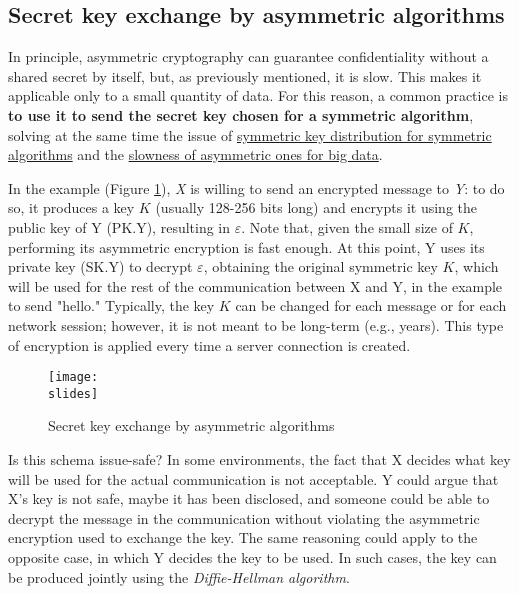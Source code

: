 \subsection{Secret key exchange by asymmetric algorithms}\label{chap:keyexchangeasymmetric}
In principle, asymmetric cryptography can guarantee confidentiality without a shared secret by itself, but, as previously mentioned, it is slow. This makes it applicable only to a small quantity of data. For this reason, a common practice is \textbf{to use it to send the secret key chosen for a symmetric algorithm}, solving at the same time the issue of \ul{symmetric key distribution for symmetric algorithms} and the \ul{slowness of asymmetric ones for big data}.

In the example (Figure \ref*{fig:keyexchangeasymmetric}), \textit{X} is willing to send an encrypted message to \textit{Y}: to do so, it produces a key \(K\) (usually 128-256 bits long) and encrypts it using the public key of Y (\(\text{PK.Y}\)), resulting in \(\varepsilon\). Note that, given the small size of \(K\), performing its asymmetric encryption is fast enough. At this point, Y uses its private key (\(\text{SK.Y}\)) to decrypt \(\varepsilon\), obtaining the original symmetric key \(K\), which will be used for the rest of the communication between X and Y, in the example to send "hello." Typically, the key \(K\) can be changed for each message or for each network session; however, it is not meant to be long-term (e.g., years). This type of encryption is applied every time a server connection is created.

\begin{figure}[h]
    \centering
    \texttt{[image: \\slides]}
    \caption{Secret key exchange
        by asymmetric algorithms}
    \label{fig:keyexchangeasymmetric}
\end{figure}

Is this schema issue-safe? In some environments, the fact that X decides what key will be used for the actual communication is not acceptable. Y could argue that X's key is not safe, maybe it has been disclosed, and someone could be able to decrypt the message in the communication without violating the asymmetric encryption used to exchange the key. The same reasoning could apply to the opposite case, in which Y decides the key to be used. In such cases, the key can be produced jointly using the \textit{Diffie-Hellman algorithm}.

